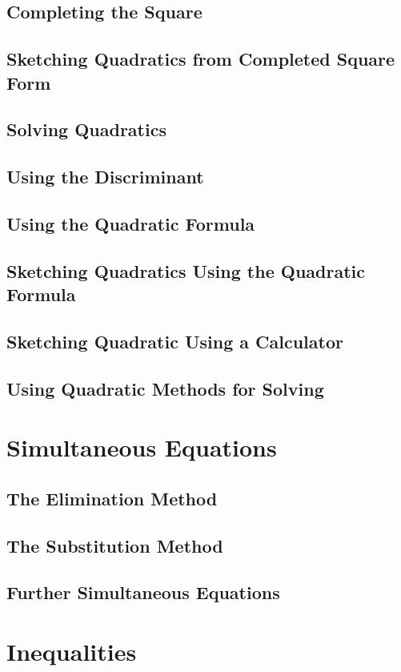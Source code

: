 \documentclass[../maths.tex]{subfiles}
\begin{document}
\subsection*{Completing the Square}
\subsection*{Sketching Quadratics from Completed Square Form}
\subsection*{Solving Quadratics}
\subsection*{Using the Discriminant}
\subsection*{Using the Quadratic Formula}
\subsection*{Sketching Quadratics Using the Quadratic Formula}
\subsection*{Sketching Quadratic Using a Calculator}
\subsection*{Using Quadratic Methods for Solving}
\section{Simultaneous Equations}
\subsection*{The Elimination Method}
\subsection*{The Substitution Method}
\subsection*{Further Simultaneous Equations}
\section{Inequalities}
\end{document}
